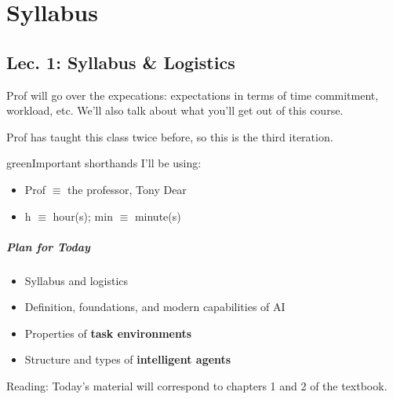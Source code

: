 \chapter{Syllabus}

\section{Lec. 1: Syllabus \& Logistics}
Prof will go over the expecations: expectations in terms of time commitment, workload, etc. We'll also talk about what you'll get out of this course.

Prof has taught this class twice before, so this is the third iteration.
\begin{mybox}{green}{Important shorthands I'll be using:}
	\begin{itemize}
	\item Prof $\equiv$ the professor, Tony Dear
	\item h $\equiv$ hour(s); min $\equiv$ minute(s)
	\end{itemize}
\end{mybox}


\paragraph*{Plan for Today}
\begin{itemize}
\item Syllabus and logistics
\item Definition, foundations, and modern capabilities of AI
\item Properties of \textbf{task environments}
\item Structure and types of \textbf{intelligent agents}
\end{itemize}

Reading: Today's material will correspond to chapters 1 and 2 of the textbook.

